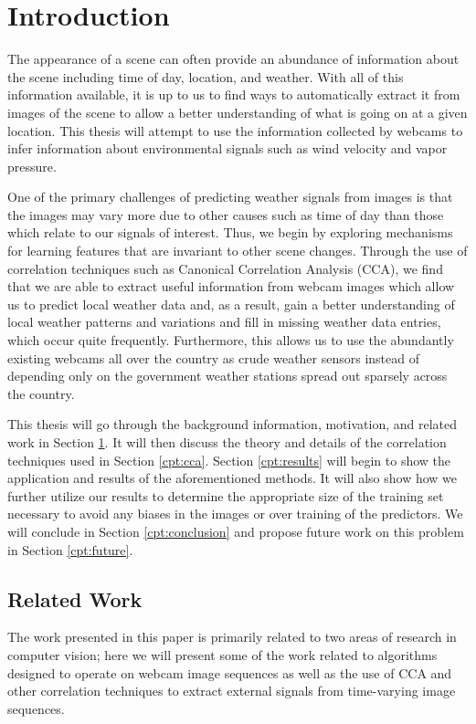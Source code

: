 \chapter{Introduction}
\label{cpt:intro}
The appearance of a scene can often provide an abundance of information about the scene including time of day, location, and weather. With all of this information available, it is up to us to find ways to automatically extract it from images of the scene to allow a better understanding of what is going on at a given location. This thesis will attempt to use the information collected by webcams to infer information about environmental signals such as wind velocity and vapor pressure. 

One of the primary challenges of predicting weather signals from images is that the images may vary more due to other causes such as time of day than those which relate to our signals of interest. Thus, we begin by exploring mechanisms for learning features that are invariant to other scene changes. Through the use of correlation techniques such as Canonical Correlation Analysis (CCA), we find that we are able to extract useful information from webcam images which allow us to predict local weather data and, as a result, gain a better understanding of local weather patterns and variations and fill in missing weather data entries, which occur quite frequently. Furthermore, this allows us to use the abundantly existing webcams all over the country as crude weather sensors instead of depending only on the government weather stations spread out sparsely across the country. 

This thesis will go through the background information, motivation, and related work in Section \ref{cpt:intro}. It will then discuss the theory and details of the correlation techniques used in Section \ref{cpt:cca}. Section \ref{cpt:results} will begin to show the application and results of the aforementioned methods. It will also show how we further utilize our results to determine the appropriate size of the training set necessary to avoid any biases in the images or over training of the predictors. We will conclude in Section \ref{cpt:conclusion} and propose future work on this problem in Section \ref{cpt:future}.

\section{Related Work}
The work presented in this paper is primarily related to two areas of research in computer vision; here we will present some of the work related to algorithms designed to operate on webcam image sequences as well as the use of CCA and other correlation techniques to extract external signals from time-varying image sequences.

